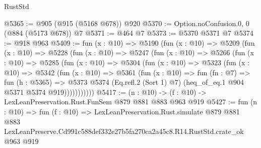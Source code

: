 \begin{lexlean}{RustStd}
\begin{coremodule}
@5365 := @905 (@915 (@5168 @678)) @920
@5370 := Option.noConfusion.{0, 0} (@884 (@5173 @678)) @7
@5371 := @464 @7
@5373 := @5370 @5371 @7
@5374 := @918 @963
@5409 := fun (x : @10) =>
  @5190
    (fun (x : @10) =>
    @5209
      (fun (x : @10) =>
      @5228
        (fun (x : @10) =>
        @5247
          (fun (x : @10) =>
          @5266
            (fun (x : @10) =>
            @5285
              (fun (x : @10) =>
              @5304
                (fun (x : @10) =>
                @5323
                  (fun (x : @10) =>
                  @5342
                    (fun (x : @10) =>
                    @5361
                      (fun (x : @10) =>
                      fun (fn : @7) =>
                      fun (h : @5365) =>
                      @5373
                        @5374
                        (Eq.refl.{2} (Sort 1) @7)
                        (heq_of_eq.{1} @904 @5371 @5374 @919)))))))))))
@5417 := (n : @10) -> (f : @10) -> LexLeanPreservation.Rust.FunSem @879 @881 @883 @963 @919
@5427 := fun (n : @10) =>
  fun (f : @10) =>
  LexLeanPreservation.Rust.simulate
    @879
    @881
    @883
    LexLeanPreserve.Cd991c588def332e27b5fa270ca2a45c8.R14.RustStd.crate_ok
    @963
    @919
\end{coremodule}
\end{lexlean}
